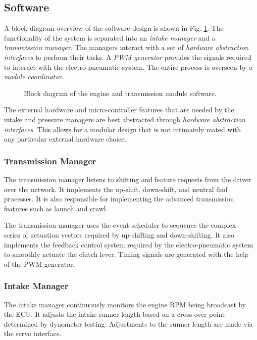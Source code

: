 \subsection{Software}

A block-diagram overview of the software design is shown in Fig. \ref{fig:engine_software_design_block}. The functionality of the system is separated into an \emph{intake manager} and a \emph{transmission manager}. The managers interact with a set of \emph{hardware abstraction interfaces} to perform their tasks. A \emph{PWM generator} provides the signals required to interact with the electro-pneumatic system. The entire process is overseen by a \emph{module coordinator}.

\begin{figure}[H]
	\centering
	
	\caption{Block diagram of the engine and transmission module software.}
	\label{fig:engine_software_design_block}
\end{figure}

The external hardware and micro-controller features that are needed by the intake and pressure managers are best abstracted through \emph{hardware abstraction interfaces}. This allows for a modular design that is not intimately mated with any particular external hardware choice. 

\subsubsection{Transmission Manager}

The transmission manager listens to shifting and feature requests from the driver over the network. It implements the up-shift, down-shift, and neutral find processes. It is also responsible for implementing the advanced transmission features such as launch and crawl.

The transmission manager uses the event scheduler to sequence the complex series of actuation vectors required by up-shifting and down-shifting. It also implements the feedback control system required by the electro-pneumatic system to smoothly actuate the clutch lever. Timing signals are generated with the help of the PWM generator.

\subsubsection{Intake Manager}

The intake manager continuously monitors the engine RPM being broadcast by the ECU. It adjusts the intake runner length based on a cross-over point determined by dynometer testing. Adjustments to the runner length are made via the servo interface.

